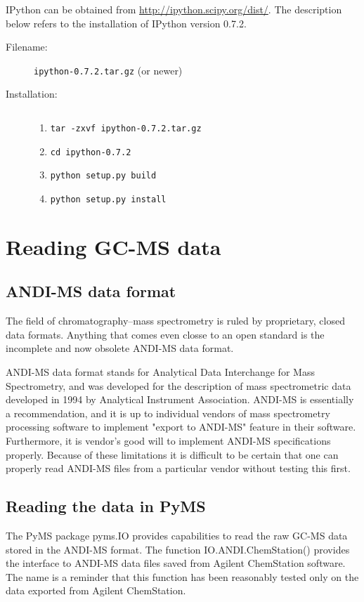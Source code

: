 IPython can be obtained from \url{http://ipython.scipy.org/dist/}. The
description below refers to the installation of IPython version 0.7.2.

\begin{description}
\item [Filename:] {\tt ipython-0.7.2.tar.gz} (or newer)
\item [Installation:] $ $
  \begin{enumerate}
  \item {\tt tar -zxvf ipython-0.7.2.tar.gz}
  \item {\tt cd ipython-0.7.2}
  \item {\tt python setup.py build}
  \item {\tt python setup.py install}
  \end{enumerate}
\end{description}


\section{Reading GC-MS data}

\subsection{ANDI-MS data format}

The field of chromatography--mass spectrometry is ruled by proprietary, closed
data formats.  Anything that comes even closse to an open standard is the
incomplete and now obsolete ANDI-MS data format.

ANDI-MS data format stands for Analytical Data Interchange for Mass
Spectrometry, and was developed for the description of mass spectrometric
data developed in 1994 by Analytical Instrument Association. ANDI-MS 
is essentially a recommendation, and it is up to individual vendors of
mass spectrometry processing software to implement "export to ANDI-MS"
feature in their software. Furthermore, it is vendor's good will to
implement ANDI-MS specifications properly. Because of these limitations
it is difficult to be certain that one can properly read ANDI-MS files
from a particular vendor without testing this first.

\subsection{Reading the data in PyMS}

The PyMS package pyms.IO provides capabilities to read the raw GC-MS
data stored in the ANDI-MS format. The function IO.ANDI.ChemStation()
provides the interface to ANDI-MS data files saved from Agilent
ChemStation software. The name is a reminder that this function has
been reasonably tested only on the data exported from Agilent ChemStation.

